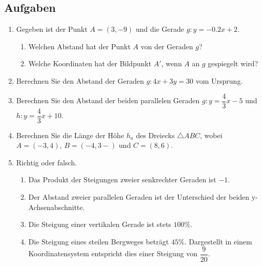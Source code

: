 \subsection{Aufgaben}
\begin{enumerate}
    \item Gegeben ist der Punkt $A=(3,-9)$ und die Gerade $g:y=-0.2x+2$.
          \begin{enumerate}
              \item Welchen Abstand hat der Punkt $A$ von der Geraden $g$?
              \item Welche Koordinaten hat der Bildpunkt $A'$, wenn $A$ an $g$ gespiegelt wird?
          \end{enumerate}
    \item Berechnen Sie den Abstand der Geraden $g:4x+3y=30$ vom Ursprung.
    \item Berechnen Sie den Abstand der beiden parallelen Geraden $g:y=\dfrac{4}{3}x-5$ und $h:y=\dfrac{4}{3}x+10$.
    \item Berechnen Sie die Länge der Höhe $h_a$ des Dreiecks $\triangle ABC$, wobei $A=(-3,4)$, $B=(-4,3-)$ und $C=(8,6)$.
    \item Richtig oder falsch.
          \begin{enumerate}
              \item Das Produkt der Steigungen zweier senkrechter Geraden ist $-1$.
              \item Der Abstand zweier parallelen Geraden ist der Unterschied der beiden y-Achsenabschnitte.
              \item Die Steigung einer vertikalen Gerade ist stets $100\%$.
              \item Die Steigung eines steilen Bergweges beträgt $45\%$. Dargestellt in einem Koordinatensystem entspricht dies einer Steigung von $\dfrac{9}{20}$.
          \end{enumerate}
\end{enumerate}
\vspace{10cm}

